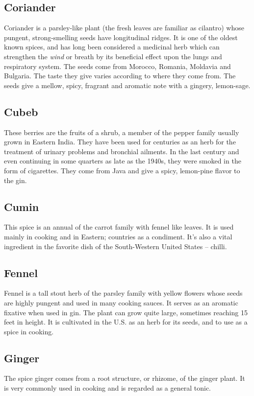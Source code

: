 \subsection*{Coriander} Coriander is a parsley-like plant (the
fresh leaves are familiar as cilantro) whose pungent, strong-smelling seeds
have longitudinal ridges. It is one of the oldest known spices, and has long
been considered a medicinal herb which can strengthen the \emph{wind} or breath
by its beneficial effect upon the lungs and respiratory system. The seeds come
from Morocco, Romania, Moldavia and Bulgaria. The taste they give varies
according to where they come from. The seeds give a mellow, spicy, fragrant and
aromatic note with a gingery, lemon-sage.

\subsection*{Cubeb} These berries are the fruits of a shrub, a
member of the pepper family usually grown in Eastern India. They have been used
for centuries as an herb for the treatment of urinary problems and bronchial
    ailments. In the last century and even continuing in some quarters as late
    as the 1940s, they were smoked in the form of cigarettes. They come from
    Java and give a spicy, lemon-pine flavor to the gin. 

\subsection*{Cumin} This spice is an annual of the carrot family
with fennel like leaves. It is used mainly in cooking and in Eastern; countries
as a condiment. It's also a vital ingredient in the favorite dish of the
South-Western United States -- chilli. 

\subsection*{Fennel} Fennel is a tall stout herb of the parsley
family with yellow flowers whose seeds are highly pungent and used in many
cooking sauces. It serves as an aromatic fixative when used in gin. The plant
can grow quite large, sometimes reaching 15 feet in height. It is cultivated in
the U.S. as an herb for its seeds, and to use as a spice in cooking. 

\subsection*{Ginger} The spice ginger comes from a root structure,
or rhizome, of the ginger plant. It is very commonly used in cooking and is
regarded as a general tonic.

